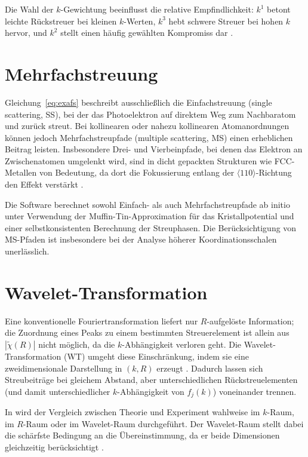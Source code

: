 Die Wahl der $k$-Gewichtung beeinflusst die relative Empfindlichkeit:
$k^1$ betont leichte Rückstreuer bei kleinen $k$-Werten,
$k^3$ hebt schwere Streuer bei hohen $k$ hervor,
und $k^2$ stellt einen häufig gewählten Kompromiss dar \cite{Bunker2010}.

\section{Mehrfachstreuung}

Gleichung~\eqref{eq:exafs} beschreibt ausschließlich die Einfachstreuung
(single scattering, SS), bei der das Photoelektron auf direktem Weg zum
Nachbaratom und zurück streut.
Bei kollinearen oder nahezu kollinearen Atomanordnungen können jedoch
Mehrfachstreupfade (multiple scattering, MS) einen erheblichen Beitrag
leisten.
Insbesondere Drei- und Vierbeinpfade, bei denen das Elektron an
Zwischenatomen umgelenkt wird, sind in dicht gepackten Strukturen wie
FCC-Metallen von Bedeutung, da dort die Fokussierung entlang der
$\langle 110\rangle$-Richtung den Effekt verstärkt \cite{Zabinsky1995}.

Die Software \feff{} \cite{Rehr2010} berechnet sowohl Einfach- als auch
Mehrfachstreupfade ab initio unter Verwendung der
Muffin-Tin-Approximation für das Kristallpotential und einer
selbstkonsistenten Berechnung der Streuphasen.
Die Berücksichtigung von MS-Pfaden ist insbesondere bei der Analyse
höherer Koordinationsschalen unerlässlich.

\section{Wavelet-Transformation}
\label{sec:wavelet}

Eine konventionelle Fouriertransformation liefert nur $R$-aufgelöste
Information; die Zuordnung eines Peaks zu einem bestimmten Streuerelement
ist allein aus $|\tilde{\chi}(R)|$ nicht möglich, da die $k$-Abhängigkeit
verloren geht.
Die Wavelet-Transformation (WT) umgeht diese Einschränkung, indem sie
eine zweidimensionale Darstellung in $(k,R)$ erzeugt
\cite{Funke2005, Timoshenko2009}.
Dadurch lassen sich Streubeiträge bei gleichem Abstand, aber
unterschiedlichen Rückstreuelementen (und damit unterschiedlicher
$k$-Abhängigkeit von $f_j(k)$) voneinander trennen.

In \evax{} wird der Vergleich zwischen Theorie und Experiment wahlweise
im $k$-Raum, im $R$-Raum oder im Wavelet-Raum durchgeführt.
Der Wavelet-Raum stellt dabei die schärfste Bedingung an die
Übereinstimmung, da er beide Dimensionen gleichzeitig berücksichtigt
\cite{Timoshenko2014}.

